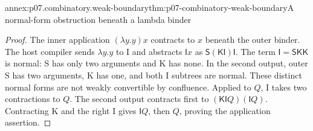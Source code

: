 \begin{annexitem}{annex:p07.combinatory.weak-boundary}{thm:p07-combinatory-weak-boundary}{A normal-form obstruction beneath a lambda binder}
\begin{proof}
The inner application \((\lambda y.y)x\) contracts to \(x\) beneath the outer
binder.  The host compiler sends \(\lambda y.y\) to I and abstracts
\(\mathsf I x\) as \(\mathsf S(\mathsf K\mathsf I)\mathsf I\).
The term \(\mathsf I=\mathsf S\mathsf K\mathsf K\) is normal: S has only
two arguments and K has none.  In the second output, outer S has two arguments,
K has one, and both I subtrees are normal.  These distinct normal forms are
not weakly convertible by confluence.  Applied to \(Q\), I takes two
contractions to \(Q\).  The second output contracts first to
\((\mathsf K\mathsf I Q)(\mathsf I Q)\).  Contracting K and the right I gives
\(\mathsf I Q\), then \(Q\), proving the application assertion.
\end{proof}
\end{annexitem}


